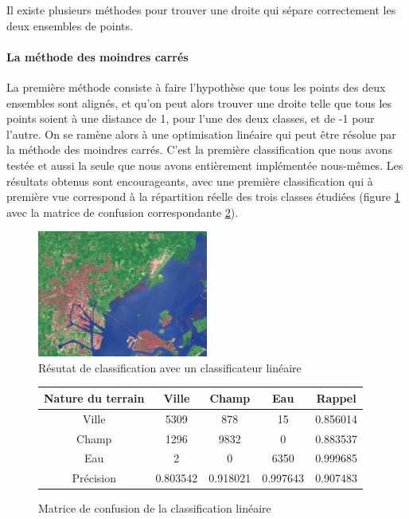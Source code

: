 \documentclass[a4paper,10pt]{report}
\begin{document}
Il existe plusieurs méthodes pour trouver une droite qui sépare correctement les deux ensembles de points.

\paragraph{La méthode des moindres carrés}
  La première méthode consiste à faire l'hypothèse que tous les points des deux ensembles sont alignés, et qu'on peut alors trouver une droite telle que tous les points soient à une distance de 1, pour l'une des deux classes, et de -1 pour l'autre. On se ramène alors à une optimisation linéaire qui peut être résolue par la méthode des moindres carrés.
  C'est la première classification que nous avons testée et aussi la seule que nous avons entièrement implémentée nous-mêmes. 
\label{lineaire}
 Les résultats obtenus sont encourageants, avec une première classification qui à première vue correspond à la répartition réelle des trois classes étudiées (figure \ref{fig:veniseLSE} avec la matrice de confusion correspondante \ref{table:confknn}).

\begin{figure}
  \centering
    \includegraphics[width=0.5\textwidth]{veniseLSE}
  \caption{Résutat de classification avec un classificateur linéaire}
  \label{fig:veniseLSE}
\end{figure}

\begin{figure}
\begin{center}
 \begin{tabular}{|c|c|c|c|c|}
  \hline
  Nature du terrain & Ville & Champ & Eau & Rappel \\
  \hline
Ville & 5309   &   878    &   15 & 0.856014 \\
Champ & 1296   &  9832     &   0  & 0.883537 \\
Eau &  2   &     0  &   6350 & 0.999685 \\
Précision & 0.803542  & 0.918021 & 0.997643 & 0.907483 \\
  \hline
\end{tabular}
\end{center}
\caption{Matrice de confusion de la classification linéaire}
\label{table:confknn}
\end{figure}
\end{document}
